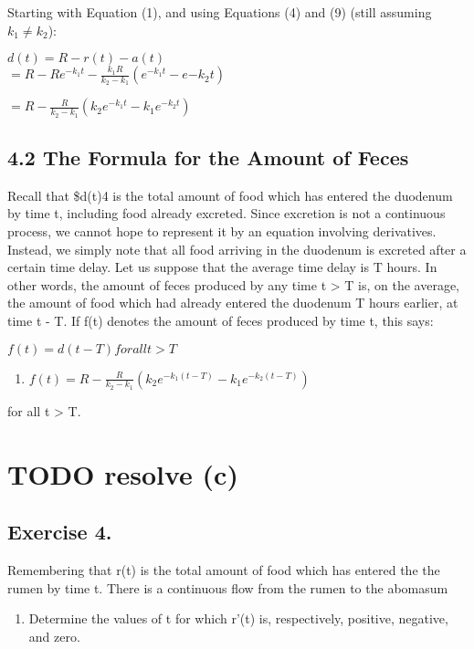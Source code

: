 \documentclass[]{article}
\providecommand{\tightlist}{%
  \setlength{\itemsep}{0pt}\setlength{\parskip}{0pt}}
\begin{document}
Starting with Equation (1), and using Equations (4) and (9) (still
assuming \(k_1 \neq k_2\)):

\(d(t) = R - r(t) - a(t)\)\\
\(= R - Re^{-k_1t} - \frac{k_1R}{k_2 - k_1} (e^{-k_1t}-e{-k_2t})\)

\(= R - \frac{R}{k_2-k_1}(k_2e^{-k_1t} - k_1e^{-k_2t})\)

\subsection{4.2 The Formula for the Amount of
Feces}\label{the-formula-for-the-amount-of-feces}

Recall that \$d(t)4 is the total amount of food which has entered the
duodenum by time t, including food already excreted. Since excretion is
not a continuous process, we cannot hope to represent it by an equation
involving derivatives. Instead, we simply note that all food arriving in
the duodenum is excreted after a certain time delay. Let us suppose that
the average time delay is T hours. In other words, the amount of feces
produced by any time t \textgreater{} T is, on the average, the amount
of food which had already entered the duodenum T hours earlier, at time
t - T. If f(t) denotes the amount of feces produced by time t, this
says:

\(f(t) = d(t-T) for all t > T\)

\begin{enumerate}
\def\labelenumi{(\arabic{enumi})}
\setcounter{enumi}{9}
\tightlist
\item
  \(f(t) = R - \frac{R}{k_2-k_1}(k_2e^{-k_1(t-T)}-k_1e^{-k_2(t-T)})\)
\end{enumerate}

for all t \textgreater{} T.

\section{TODO resolve (c)}\label{todo-resolve-c}

\subsection{Exercise 4.}\label{exercise-4.}

Remembering that r(t) is the total amount of food which has entered the
the rumen by time t. There is a continuous flow from the rumen to the
abomasum

\begin{enumerate}
\def\labelenumi{(\alph{enumi})}
\tightlist
\item
  Determine the values of t for which r'(t) is, respectively, positive,
  negative, and zero.
\end{enumerate}
\end{document}
